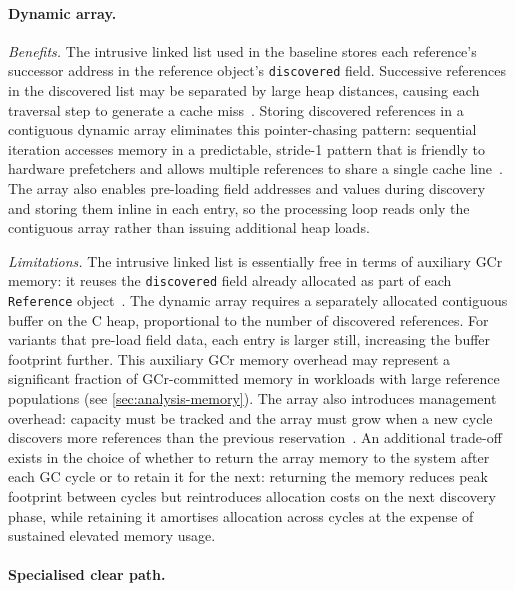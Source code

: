 \paragraph{Dynamic array.}

\emph{Benefits.} The intrusive linked list used in the baseline stores each reference's successor address in the reference object's \texttt{discovered} field. Successive references in the discovered list may be separated by large heap distances, causing each traversal step to generate a cache miss~\cite{drepper07-memory}. Storing discovered references in a contiguous dynamic array eliminates this pointer-chasing pattern: sequential iteration accesses memory in a predictable, stride-1 pattern that is friendly to hardware prefetchers and allows multiple references to share a single cache line~\cite{drepper07-memory,jones11-gc-handbook}. The array also enables pre-loading field addresses and values during discovery and storing them inline in each entry, so the processing loop reads only the contiguous array rather than issuing additional heap loads.

\emph{Limitations.} The intrusive linked list is essentially free in terms of auxiliary \ac{GCr} memory: it reuses the \texttt{discovered} field already allocated as part of each \texttt{Reference} object~\cite{openjdk-reference-java}. The dynamic array requires a separately allocated contiguous buffer on the C heap, proportional to the number of discovered references. For variants that pre-load field data, each entry is larger still, increasing the buffer footprint further. This auxiliary \ac{GCr} memory overhead may represent a significant fraction of \ac{GCr}-committed memory in workloads with large reference populations (see \cref{sec:analysis-memory}). The array also introduces management overhead: capacity must be tracked and the array must grow when a new cycle discovers more references than the previous reservation~\cite{openjdk-zreferenceprocessor-cpp}. An additional trade-off exists in the choice of whether to return the array memory to the system after each \ac{GC} cycle or to retain it for the next: returning the memory reduces peak footprint between cycles but reintroduces allocation costs on the next discovery phase, while retaining it amortises allocation across cycles at the expense of sustained elevated memory usage.

\paragraph{Specialised clear path.}


